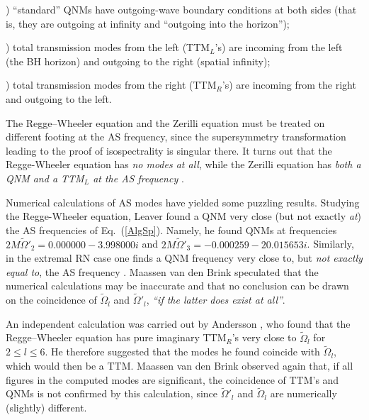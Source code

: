 \documentclass[]{iopart}
\begin{document}
) ``standard'' QNMs have outgoing-wave boundary conditions at both
sides (that is, they are outgoing at infinity and ``outgoing into the
horizon'');

) total transmission modes from the left (TTM$_L$'s) are incoming
from the left (the BH horizon) and outgoing to the right (spatial infinity);

) total transmission modes from the right (TTM$_R$'s) are incoming
from the right and outgoing to the left.

The Regge--Wheeler equation and the Zerilli equation must be treated on
different footing at the AS frequency, since the supersymmetry transformation
leading to the proof of isospectrality is singular there. It turns out that
the Regge-Wheeler equation has {\it no modes at all}, while the Zerilli
equation has {\it both a QNM and a TTM$_L$ at the AS frequency}
\cite{MaassenvandenBrink:2000ru}.

Numerical calculations of AS modes have yielded some puzzling
results. Studying the Regge-Wheeler equation, Leaver \cite{Leaver:1985ax}
found a QNM very close (but not exactly {\it at}) the AS frequencies of
Eq.~(\ref{AlgSp}). Namely, he found QNMs at frequencies $2M\tilde
\Omega'_2=0.000000-3.998000i$ and $2M\tilde \Omega'_3=-0.000259-20.015653i$.
%
Similarly, in the extremal RN case one finds a QNM frequency very close to,
but {\it not exactly equal to}, the AS frequency \cite{Berti:2004md}. Maassen
van den Brink \cite{MaassenvandenBrink:2000ru} speculated that the numerical
calculations may be inaccurate and that no conclusion can be drawn on the
coincidence of $\tilde \Omega_l$ and $\tilde \Omega'_l$, {\it ``if the latter
  does exist at all''}.

An independent calculation was carried out by Andersson
\cite{Andersson:1994tt}, who found that the Regge--Wheeler equation has pure
imaginary TTM$_R$'s very close to $\tilde \Omega_l$ for $2\leq l\leq 6$. He
therefore suggested that the modes he found coincide with $\tilde \Omega_l$,
which would then be a TTM.  Maassen van den Brink
\cite{MaassenvandenBrink:2000ru} observed again that, if all figures in the
computed modes are significant, the coincidence of TTM's and QNMs is not
confirmed by this calculation, since $\tilde \Omega'_l$ and $\tilde \Omega_l$
are numerically (slightly) different.
\end{document}
